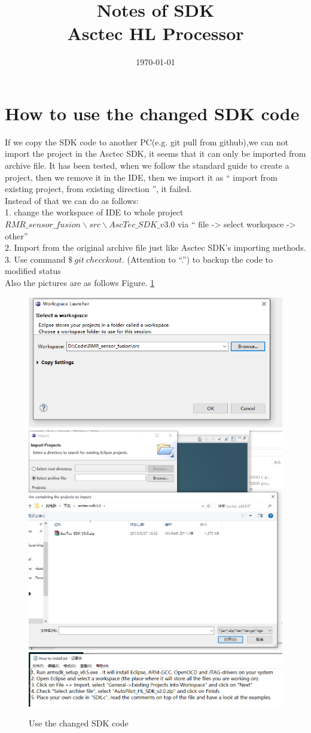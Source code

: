 \documentclass[twoside,colorbacktitle,accentcolor=tud6a]{tudexercise}
\title{Notes of  SDK \\Asctec HL Processor}
\subtitle{\today}
\begin{document}
\renewcommand{\figurename}{Figure.} 	
\setcounter{section}{0}
\maketitle
  \section{How to use the changed SDK code}
 If we copy the SDK code to another PC(e.g. git pull from github),we can not import the project in the Asctec SDK, it seems that it can only be imported from archive file. It has been tested, when we follow the standard guide to create a project, then we remove it in the IDE, then we import it as `` import from existing project, from existing direction '', it failed. \\
 
 Instead of that we can do as follows:\\
  1. change the workspace of IDE to whole project $RMR\_sensor\_fusion \backslash src  \backslash  AscTec\_SDK\_v3.0$ via `` file -> select workspace -> other''\\
  2. Import from the original archive file just like Asctec SDK's importing methods.\\
  3. Use command $ \$\ git\ checckout . $ (Attention to ``.'') to backup the code to modified status \\
  
  Also the pictures are as follows Figure. \ref{fig:note12} \\
  
  \begin{figure}[ht] 	
  	
  	\includegraphics[width=0.5\linewidth]{fig/Note1_2}
  	\includegraphics[width=0.5\linewidth]{fig/Note1_4}  
  	\includegraphics[width=0.9\linewidth]{fig/Note1_3}
  	\caption{Use the changed SDK code}  	
  	\label{fig:note12}
  \end{figure}
  
\end{document}
